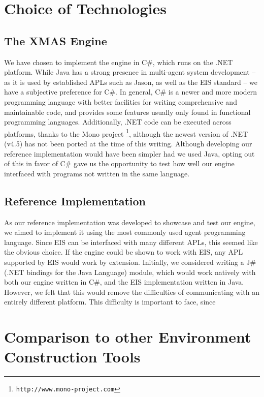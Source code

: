 \section{Choice of Technologies}


\subsection*{The XMAS Engine}

We have chosen to implement the engine in C\#, which runs on the .NET
platform. While Java has a strong presence in multi-agent system development
-- as it is used by established APLs such as Jason, as well as the
EIS standard -- we have a subjective preference for C\#. In general,
C\# is a newer and more modern programming language with better facilities
for writing comprehensive and maintainable code, and provides some
features usually only found in functional programming languages. Additionally,
.NET code can be executed across platforms, thanks to the Mono project%
\footnote{\texttt{http://www.mono-project.com}%
}, although the newest version of .NET (v4.5) has not been ported at
the time of this writing. Although developing our reference implementation
would have been simpler had we used Java, opting out of this in favor
of C\# gave us the opportunity to test how well our engine interfaced
with programs not written in the same language. 


\subsection*{Reference Implementation}

As our reference implementation was developed to showcase and test
our engine, we aimed to implement it using the most commonly used
agent programming language. Since EIS can be interfaced with many
different APLs, this seemed like the obvious choice. If the engine
could be shown to work with EIS, any APL supported by EIS would work
by extension. Initially, we considered writing a J\# (.NET bindings
for the Java Language) module, which would work natively with both
our engine written in C\#, and the EIS implementation written in Java.
However, we felt that this would remove the difficulties of communicating
with an entirely different platform. This difficulty is important
to face, since 


\section{Comparison to other Environment Construction Tools}

